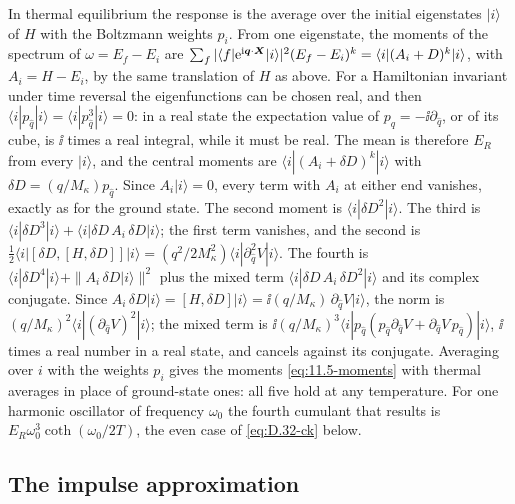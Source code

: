 In thermal equilibrium the response is the average over the initial eigenstates $|i\rangle$ of $H$ with the Boltzmann weights $p_i$. From one eigenstate, the moments of the spectrum of $\omega = E_f - E_i$ are $\sum_f|\langle f|\mathrm{e}^{\mathrm{i}\bm{q}\cdot\bm{X}}|i\rangle|^2(E_f - E_i)^k = \langle i|(A_i + D)^k|i\rangle$, with $A_i = H - E_i$, by the same translation of $H$ as above. For a Hamiltonian invariant under time reversal the eigenfunctions can be chosen real, and then $\langle i|p_{\hat q}|i\rangle = \langle i|p_{\hat q}^3|i\rangle = 0$: in a real state the expectation value of $p_{\hat q} = -\ii\partial_{\hat q}$, or of its cube, is $\ii$ times a real integral, while it must be real. The mean is therefore $E_R$ from every $|i\rangle$, and the central moments are $\langle i|(A_i + \delta D)^k|i\rangle$ with $\delta D = (q/M_\kappa)p_{\hat q}$. Since $A_i|i\rangle = 0$, every term with $A_i$ at either end vanishes, exactly as for the ground state. The second moment is $\langle i|\delta D^2|i\rangle$. The third is $\langle i|\delta D^3|i\rangle + \langle i|\delta D\,A_i\,\delta D|i\rangle$; the first term vanishes, and the second is $\frac12\langle i|[\delta D,[H,\delta D]]|i\rangle = (q^2/2M_\kappa^2)\langle i|\partial_{\hat q}^2V|i\rangle$. The fourth is $\langle i|\delta D^4|i\rangle + \|A_i\,\delta D|i\rangle\|^2$ plus the mixed term $\langle i|\delta D\,A_i\,\delta D^2|i\rangle$ and its complex conjugate. Since $A_i\,\delta D|i\rangle = [H, \delta D]|i\rangle = \ii(q/M_\kappa)\,\partial_{\hat q}V|i\rangle$, the norm is $(q/M_\kappa)^2\langle i|(\partial_{\hat q}V)^2|i\rangle$; the mixed term is $\ii(q/M_\kappa)^3\langle i|p_{\hat q}(p_{\hat q}\partial_{\hat q}V + \partial_{\hat q}V\,p_{\hat q})|i\rangle$, $\ii$ times a real number in a real state, and cancels against its conjugate. Averaging over $i$ with the weights $p_i$ gives the moments \cref{eq:11.5-moments} with thermal averages in place of ground-state ones: all five hold at any temperature. For one harmonic oscillator of frequency $\omega_0$ the fourth cumulant that results is $E_R\omega_0^3\coth(\omega_0/2T)$, the even case of \cref{eq:D.32-ck} below.

\subsection{The impulse approximation}

